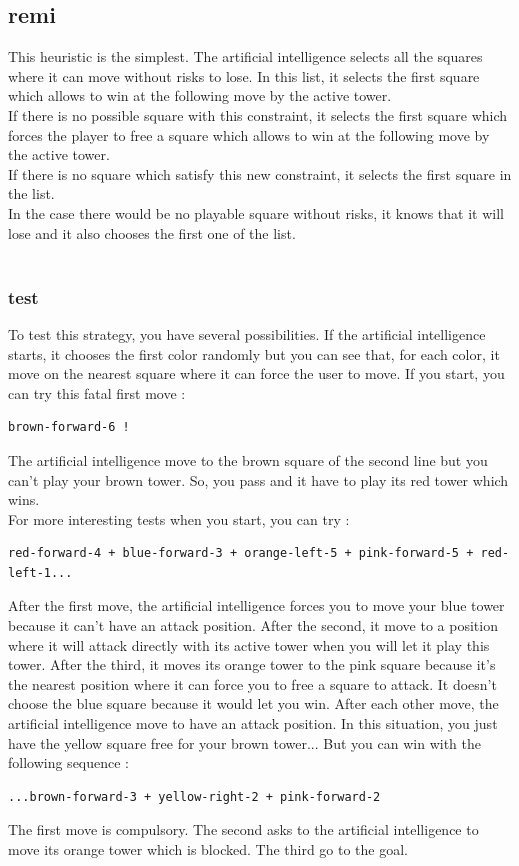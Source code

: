\documentclass[a4paper, 11pt]{article}
\begin{document}
\subsection{remi}
This heuristic is the simplest. The artificial intelligence selects all the squares where it can move without risks to lose. In this list, it selects the first square which allows to win at the following move by the active tower.\\
If there is no possible square with this constraint, it selects the first square which forces the player to free a square which allows to win at the following move by the active tower.\\
If there is no square which satisfy this new constraint, it selects the first square in the list.\\
In the case there would be no playable square without risks, it knows that it will lose and it also chooses the first one of the list.\\ \\

\subsubsection{test}
To test this strategy, you have several possibilities. If the artificial intelligence starts, it chooses the first color randomly but you can see that, for each color, it move on the nearest square where it can force the user to move.
If you start, you can try this fatal first move : 
\begin{verbatim}
brown-forward-6 !
\end{verbatim}
The artificial intelligence move to the brown square of the second line but you can't play your brown tower. So, you pass and it have to play its red tower which wins.\\
For more interesting tests when you start, you can try :
\begin{verbatim}
red-forward-4 + blue-forward-3 + orange-left-5 + pink-forward-5 + red-left-1...
\end{verbatim}
After the first move, the artificial intelligence forces you to move your blue tower because it can't have an attack position. After the second, it move to a position where it will attack directly with its active tower when you will let it play this tower.
After the third, it moves its orange tower to the pink square because it's the nearest position where it can force you to free a square to attack. It doesn't choose the blue square because it would let you win. After each other move, the artificial intelligence move to have an attack position. 
In this situation, you just have the yellow square free for your brown tower... But you can win with the following sequence : 
\begin{verbatim}
...brown-forward-3 + yellow-right-2 + pink-forward-2
\end{verbatim}
The first move is compulsory. The second asks to the artificial intelligence to move its orange tower which is blocked. The third go to the goal.
\end{document}
